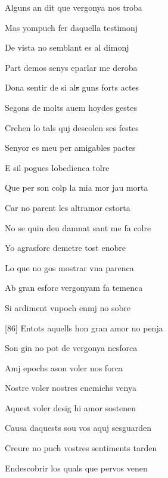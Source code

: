 \documentclass[12pt]{article}
\begin{document}
\begin{estrofa}

 Alguns an dit que vergonya nos troba

 Mas yompuch fer daquella testimonj

 De vista no semblant es al dimonj

 Part demos senys eparlar me deroba

 Dona sentir de si al\sout{s} guns forts actes

 Segons de molts auem hoydes gestes

 Crehen lo tals quj descolen ses festes

 Senyor es meu per amigables pactes

\end{estrofa}



\begin{estrofa}

 E sil pogues lobedienca tolre

 Que per son colp la mia mor jau morta

 Car no parent les altramor estorta

 No se quin deu damnat sant me fa colre

 Yo agrasforc demetre tost enobre

 Lo que no gos mostrar vna parenca

 Ab gran esforc vergonyam fa temenca

 Si ardiment vnpoch enmj no sobre

\end{estrofa}



\begin{estrofa}

 [86] Entots aquells hon gran amor no penja

 Son gin no pot de vergonya nesforca

 Amj epochs ason voler nos forca

 Nostre voler nostres enemichs venya

 Aquest voler desig hi amor sostenen

 Causa daquests sou vos aquj sesguarden

 Creure no puch vostres sentiments tarden

 Endescobrir los quals que pervos venen

\end{estrofa}
\end{document}
